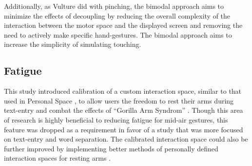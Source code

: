 Additionally, as Vulture did with pinching, the bimodal approach aims to minimize the effects of decoupling by reducing the overall complexity of the interaction between the motor space and the displayed screen and removing the need to actively make specific hand-gestures. The bimodal approach aims to increase the simplicity of simulating touching.

\subsection{Fatigue} \label{gorilla_arm_syndrome}
This study introduced calibration of a custom interaction space, similar to that used in Personal Space \cite{ref_alvin_thesis}, to allow users the freedom to rest their arms during text-entry and combat the effects of ``Gorilla Arm Syndrom'' \cite{ref_darren_thesis,ref_gorilla_arm}. Though this area of research is highly beneficial to reducing fatigue for mid-air gestures, this feature was dropped as a requirement in favor of a study that was more focused on text-entry and word separation. The calibrated interaction space could also be further improved by implementing better methods of personally defined interaction spaces for resting arms \cite{ref_alvin_thesis,ref_darren_thesis}.